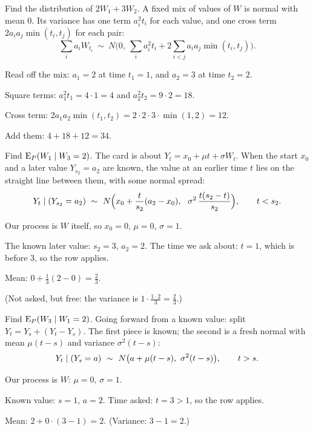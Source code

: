 \begin{problem}[Q1(a)]
Find the distribution of $2W_1+3W_2$.
\cardsays A fixed mix of values of $W$ is normal with mean $0$. Its variance has one term $a_i^2t_i$ for each value, and one cross term $2a_ia_j\min(t_i,t_j)$ for each pair:
\[
\sum_ia_iW_{t_i}\ \sim\ N\Big(0,\ \sum_ia_i^2t_i+2\sum_{i<j}a_ia_j\min(t_i,t_j)\Big).
\]
\working
\begin{steps}
\item Read off the mix: $a_1=2$ at time $t_1=1$, and $a_2=3$ at time $t_2=2$.
\item Square terms: $a_1^2t_1=4\cdot1=4$ and $a_2^2t_2=9\cdot2=18$.
\item Cross term: $2a_1a_2\min(t_1,t_2)=2\cdot2\cdot3\cdot\min(1,2)=12$.
\item Add them: $4+18+12=34$.
\end{steps}
\end{problem}

\begin{problem}[Q1(b)]
Find $\operatorname{E}_P(W_1\mid W_3=2)$.
\cardsays The card is about $Y_t=x_0+\mu t+\sigma W_t$. When the start $x_0$ and a later value $Y_{s_2}=a_2$ are known, the value at an earlier time $t$ lies on the straight line between them, with some normal spread:
\[
Y_t\given(Y_{s_2}=a_2)\ \sim\ N\Big(x_0+\frac{t}{s_2}(a_2-x_0),\ \ \sigma^2\,\frac{t(s_2-t)}{s_2}\Big),\qquad t<s_2.
\]
\working
\begin{steps}
\item Our process is $W$ itself, so $x_0=0$, $\mu=0$, $\sigma=1$.
\item The known later value: $s_2=3$, $a_2=2$. The time we ask about: $t=1$, which is before $3$, so the row applies.
\item Mean: $0+\frac13(2-0)=\frac23$.
\item (Not asked, but free: the variance is $1\cdot\frac{1\cdot2}{3}=\frac23$.)
\end{steps}
\end{problem}

\begin{problem}[Q1(c)]
Find $\operatorname{E}_P(W_3\mid W_1=2)$.
\cardsays Going forward from a known value: split $Y_t=Y_s+(Y_t-Y_s)$. The first piece is known; the second is a fresh normal with mean $\mu(t-s)$ and variance $\sigma^2(t-s)$:
\[
Y_t\given(Y_s=a)\ \sim\ N\big(a+\mu(t-s),\ \sigma^2(t-s)\big),\qquad t>s.
\]
\working
\begin{steps}
\item Our process is $W$: $\mu=0$, $\sigma=1$.
\item Known value: $s=1$, $a=2$. Time asked: $t=3>1$, so the row applies.
\item Mean: $2+0\cdot(3-1)=2$. (Variance: $3-1=2$.)
\end{steps}
\end{problem}


